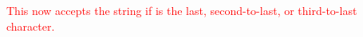 \textcolor{red}{
    This now accepts the string if  is the last, second-to-last, or third-to-last character.
}